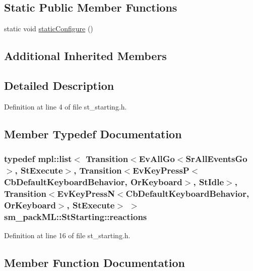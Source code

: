 \subsection*{Static Public Member Functions}
\begin{DoxyCompactItemize}
\item 
static void \hyperlink{structsm__packML_1_1StStarting_a027b510edb3a7fc5bc344ad9b7917f79}{static\+Configure} ()
\end{DoxyCompactItemize}
\subsection*{Additional Inherited Members}


\subsection{Detailed Description}


Definition at line 4 of file st\+\_\+starting.\+h.



\subsection{Member Typedef Documentation}
\subsubsection[{\texorpdfstring{reactions}{reactions}}]{\setlength{\rightskip}{0pt plus 5cm}typedef mpl\+::list$<$ Transition$<$Ev\+All\+Go$<$Sr\+All\+Events\+Go$>$, {\bf St\+Execute}$>$, Transition$<$Ev\+Key\+PressP$<$Cb\+Default\+Keyboard\+Behavior, {\bf Or\+Keyboard}$>$, {\bf St\+Idle}$>$, Transition$<$Ev\+Key\+PressN$<$Cb\+Default\+Keyboard\+Behavior, {\bf Or\+Keyboard}$>$, {\bf St\+Execute}$>$ $>$ {\bf sm\+\_\+pack\+M\+L\+::\+St\+Starting\+::reactions}}\hypertarget{structsm__packML_1_1StStarting_a1479e976adda40e56599f8587ba6fd69}{}\label{structsm__packML_1_1StStarting_a1479e976adda40e56599f8587ba6fd69}


Definition at line 16 of file st\+\_\+starting.\+h.



\subsection{Member Function Documentation}
